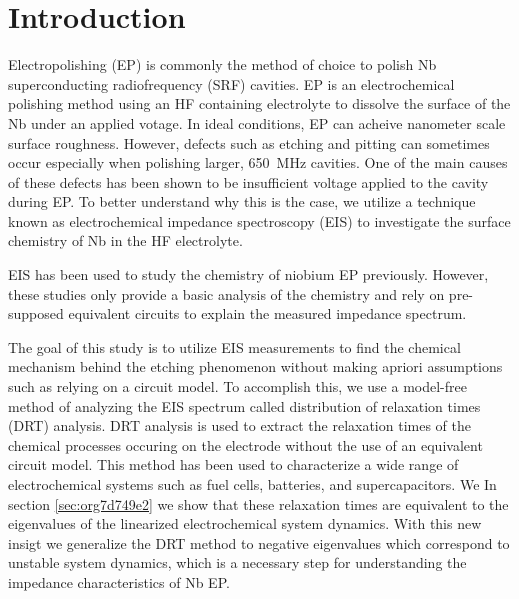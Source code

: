 \section{Introduction}
\label{sec:org5ef967f}
Electropolishing (EP) is commonly the method of choice to polish Nb superconducting radiofrequency (SRF) cavities. EP is an electrochemical polishing method using an HF containing electrolyte to dissolve the surface of the Nb under an applied votage. In ideal conditions, EP can acheive nanometer scale surface roughness. However, defects such as etching and pitting can sometimes occur especially when polishing larger, \qty{650}{\mega\hertz} cavities. One of the main causes of these defects has been shown to be insufficient voltage applied to the cavity during EP.\cite{chouhan2022study,viklund2022studies,chouhan2023electropolishing} To better understand why this is the case, we utilize a technique known as electrochemical impedance spectroscopy (EIS) to investigate the surface chemistry of Nb in the HF electrolyte.

EIS has been used to study the chemistry of niobium EP previously.\cite{cattarin2002nb,Tian_2008, tian2008novel, ranjith2018anodic} However, these studies only provide a basic analysis of the chemistry and rely on pre-supposed equivalent circuits to explain the measured impedance spectrum.

The goal of this study is to utilize EIS measurements to find the chemical mechanism behind the etching phenomenon without making apriori assumptions such as relying on a circuit model. To accomplish this, we use a model-free method of analyzing the EIS spectrum called distribution of relaxation times (DRT) analysis.\cite{10.1063/1.1745355, wan2015influence, ZHANG2015464} DRT analysis is used to extract the relaxation times of the chemical processes occuring on the electrode without the use of an equivalent circuit model. This method has been used to characterize a wide range of electrochemical systems such as fuel cells,\cite{Sonn_2008, schichlein2002deconvolution, Leonide_2008} batteries,\cite{SCHMIDT201370, batteries5020043, SONI202297} and supercapacitors.\cite{HELSETH2019100912} We  In section \ref{sec:org7d749e2} we show that these relaxation times are equivalent to the eigenvalues of the linearized electrochemical system dynamics. With this new insigt we generalize the DRT method to negative eigenvalues which correspond to unstable system dynamics, which is a necessary step for understanding the impedance characteristics of Nb EP.

